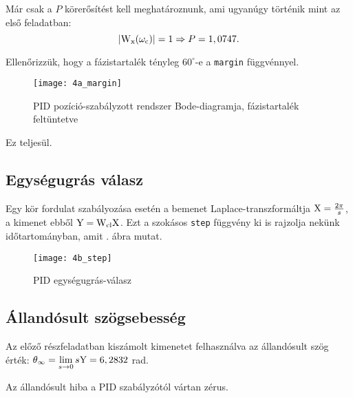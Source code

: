 Már csak a $P$ körerősítést kell meghatároznunk, ami ugyanúgy történik mint az első feladatban:
\begin{equation}
	\left\lvert \mathrm{W}_\text{x}(\omega_\text{c}) \right\rvert = 1 \Rightarrow P = 1,0747.
\end{equation}

Ellenőrizzük, hogy a fázistartalék tényleg $60^\circ$-e a \verb|margin| függvénnyel.
\begin{figure}[H]
	\centering
	\texttt{[image: 4a\_margin]}
	\caption{PID pozíció-szabályzott rendszer Bode-diagramja, fázistartalék feltüntetve}
	\label{fig:4a_margin}
\end{figure}

Ez teljesül.


\subsection{Egységugrás válasz}

Egy kör fordulat szabályozása esetén a bemenet Laplace-transzformáltja $\mathrm{X}=\frac{2\pi}{s}$,
a kimenet ebből $\mathrm{Y} = \mathrm{W}_\text{cl}\mathrm{X}$. Ezt a szokásos \verb|step| függvény
ki is rajzolja nekünk időtartományban, amit . ábra mutat.

\begin{figure}[H]
	\centering
	\texttt{[image: 4b\_step]}
	\caption{PID egységugrás-válasz}
	\label{fig:4b_step}
\end{figure}


\subsection{Állandósult szögsebesség}

Az előző részfeladatban kiszámolt kimenetet felhasználva az állandósult szög érték:
$\theta_\infty = \lim\limits_{s\rightarrow 0}s\mathrm{Y} = 6,2832$ rad.

Az állandósult hiba a PID szabályzótól vártan zérus.

